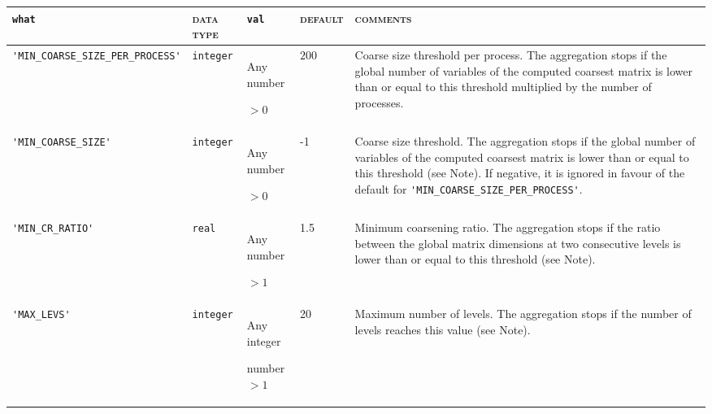 \bsideways
\begin{center}
\begin{tabular}{|p{5.7cm}|l|p{2.3cm}|p{2.5cm}|p{6.9cm}|}
\hline
\verb|what|              & \textsc{data type}        &  \verb|val|      &  \textsc{default}  &
\textsc{comments} \\ \hline
\verb|'MIN_COARSE_SIZE_PER_PROCESS'| & \verb|integer|
                         & Any number \par $> 0$
                         & $200$
                         & Coarse size threshold per process. The aggregation stops
                            if  the global number of variables of the
                            computed coarsest matrix
                            is lower than or equal to this threshold
                           multiplied by the number of processes.

                           \\ \hline
\verb|'MIN_COARSE_SIZE'| & \verb|integer|
                         & Any number \par $> 0$
                         & -1
                         & Coarse size threshold. The aggregation stops
                            if  the global number of variables of the
                            computed coarsest matrix
                            is lower than or equal to this threshold
                           (see Note). If negative, it is ignored in
                           favour of the default for
                           \verb|'MIN_COARSE_SIZE_PER_PROCESS'|. 
                           \\ \hline

\verb|'MIN_CR_RATIO'| & \verb|real|
                         & Any number \par $> 1$
                         & 1.5
                         & Minimum coarsening ratio. The aggregation stops
                            if the ratio between the global matrix dimensions
                            at two consecutive levels is lower than or equal to this
                            threshold (see Note).\\ \hline

\verb|'MAX_LEVS'| & \verb|integer|
                         & Any integer \par number $> 1$
                         & 20
                         & Maximum number of levels. The aggregation stops
                           if the number of levels reaches this value (see Note). \\ \hline


\end{tabular}
\end{center}
